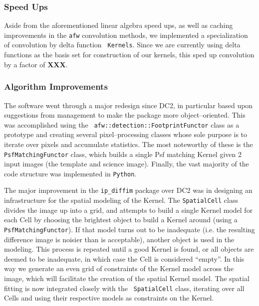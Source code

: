\subsubsection{Speed Ups}

Aside from the aforementioned linear algebra speed ups, as well as
caching improvements in the {\tt afw} convolution methods, we
implemented a specialization of convolution by delta function {\tt
Kernels}.  Since we are currently using delta functions as the basis
set for construction of our kernels, this sped up convolution by a
factor of {\bf XXX}.

\subsubsection{Algorithm Improvements}

The software went through a major redesign since DC2, in particular
based upon suggestions from management to make the package more
object--oriented.  This was accomplished using the {\tt
afw::detection::FootprintFunctor} class as a prototype and creating
several pixel--processing classes whose sole purpose is to iterate
over pixels and accumulate statistics.  The most noteworthy of these
is the {\tt PsfMatchingFunctor} class, which builds a single Psf
matching Kernel given 2 input images (the template and science image).
Finally, the vast majority of the code structure was implemented in
{\tt Python}.

The major improvement in the {\tt ip\_diffim} package over DC2 was in
designing an infrastructure for the spatial modeling of the Kernel.
The {\tt SpatialCell} class divides the image up into a grid, and
attempts to build a single Kernel model for each Cell by choosing the
brightest object to build a Kernel around (using a {\tt
PsfMatchingFunctor}).  If that model turns out to be inadequate
(i.e. the resulting difference image is noisier than is acceptable),
another object is used in the modeling.  This process is repeated
until a good Kernel is found, or all objects are deemed to be
inadequate, in which case the Cell is considered ``empty''.  In this
way we generate an even grid of constraints of the Kernel model across
the image, which will facilitate the creation of the spatial Kernel
model.  The spatial fitting is now integrated closely with the {\tt
SpatialCell} class, iterating over all Cells and using their
respective models as constraints on the Kernel.

